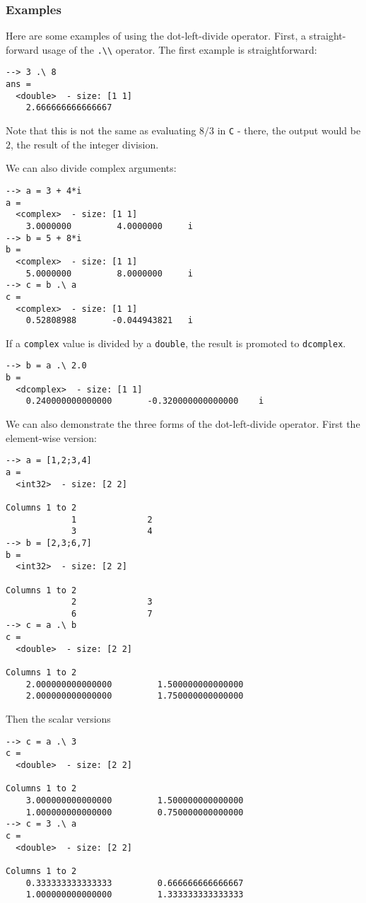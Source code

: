 \subsubsection{Examples}
Here are some examples of using the dot-left-divide operator.  First, a 
straight-forward usage of the \verb|.\\| operator.  The first example
is straightforward:
\begin{verbatim}
--> 3 .\ 8
ans =
  <double>  - size: [1 1]
    2.666666666666667
\end{verbatim}
Note that this is not the same as evaluating $8/3$ in \verb|C| - there,
the output would be $2$, the result of the integer division.

We can also divide complex arguments:
\begin{verbatim}
--> a = 3 + 4*i
a =
  <complex>  - size: [1 1]
    3.0000000         4.0000000     i
--> b = 5 + 8*i
b =
  <complex>  - size: [1 1]
    5.0000000         8.0000000     i
--> c = b .\ a
c =
  <complex>  - size: [1 1]
    0.52808988       -0.044943821   i
\end{verbatim}
If a \verb|complex| value is divided by a \verb|double|, the result is 
promoted to \verb|dcomplex|.
\begin{verbatim}
--> b = a .\ 2.0
b =
  <dcomplex>  - size: [1 1]
    0.240000000000000       -0.320000000000000    i
\end{verbatim}
We can also demonstrate the three forms of the dot-left-divide operator.  First
the element-wise version:
\begin{verbatim}
--> a = [1,2;3,4]
a =
  <int32>  - size: [2 2]
  
Columns 1 to 2
             1              2
             3              4
--> b = [2,3;6,7]
b =
  <int32>  - size: [2 2]
  
Columns 1 to 2
             2              3
             6              7
--> c = a .\ b
c =
  <double>  - size: [2 2]
  
Columns 1 to 2
    2.000000000000000         1.500000000000000
    2.000000000000000         1.750000000000000
\end{verbatim}
Then the scalar versions
\begin{verbatim}
--> c = a .\ 3
c =
  <double>  - size: [2 2]
  
Columns 1 to 2
    3.000000000000000         1.500000000000000
    1.000000000000000         0.750000000000000
--> c = 3 .\ a
c =
  <double>  - size: [2 2]
  
Columns 1 to 2
    0.333333333333333         0.666666666666667
    1.000000000000000         1.333333333333333
\end{verbatim}
